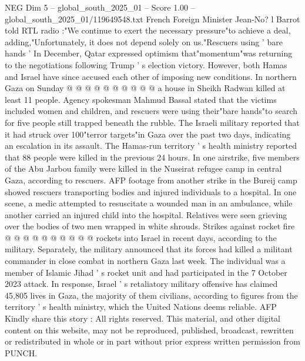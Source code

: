 \begin{textsample}{NEG Dim 5 – global\_south\_2025\_01 – Score 1.00 – global\_south\_2025\_01/119649548.txt}
French Foreign Minister Jean-No? l Barrot told RTL radio :"We continue to exert the necessary pressure"to achieve a deal, adding,"Unfortunately, it does not depend solely on us."Rescuers using ' bare hands ' In December, Qatar expressed optimism that"momentum"was returning to the negotiations following Trump ' s election victory.
However, both Hamas and Israel have since accused each other of imposing new conditions.
In northern Gaza on Sunday @ @ @ @ @ @ @ @ @ @ a house in Sheikh Radwan killed at least 11 people.
Agency spokesman Mahmud Bassal stated that the victims included women and children, and rescuers were using their"bare hands"to search for five people still trapped beneath the rubble.
The Israeli military reported that it had struck over 100"terror targets"in Gaza over the past two days, indicating an escalation in its assault.
The Hamas-run territory ' s health ministry reported that 88 people were killed in the previous 24 hours.
In one airstrike, five members of the Abu Jarbou family were killed in the Nuseirat refugee camp in central Gaza, according to rescuers.
AFP footage from another strike in the Bureij camp showed rescuers transporting bodies and injured individuals to a hospital.
In one scene, a medic attempted to resuscitate a wounded man in an ambulance, while another carried an injured child into the hospital.
Relatives were seen grieving over the bodies of two men wrapped in white shrouds.
Strikes against rocket fire @ @ @ @ @ @ @ @ @ @ rockets into Israel in recent days, according to the military.
Separately, the military announced that its forces had killed a militant commander in close combat in northern Gaza last week.
The individual was a member of Islamic Jihad ' s rocket unit and had participated in the 7 October 2023 attack.
In response, Israel ' s retaliatory military offensive has claimed 45,805 lives in Gaza, the majority of them civilians, according to figures from the territory ' s health ministry, which the United Nations deems reliable.
AFP Kindly share this story : All rights reserved.
This material, and other digital content on this website, may not be reproduced, published, broadcast, rewritten or redistributed in whole or in part without prior express written permission from PUNCH.

\end{textsample}
